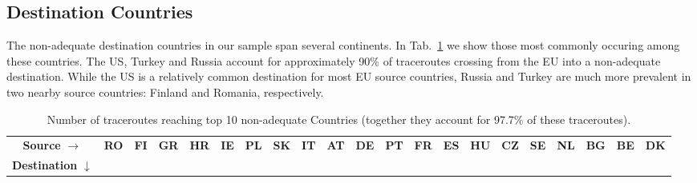 \subsection{Destination Countries}
The non-adequate destination countries in our sample
span several continents. 
In Tab.~\ref{tab:traceroutesheat} we show
those most commonly occuring among these countries.
The US, Turkey and Russia account for approximately 90\% of
traceroutes crossing from the EU into a non-adequate destination.
While the US is a relatively common destination for most EU
source countries, Russia and Turkey are much more prevalent in 
two nearby source countries: Finland and Romania, respectively.


\begin{table}
  \caption{Number of traceroutes reaching top 10 non-adequate Countries (together they account for 97.7\% of these traceroutes).}
  \label{tab:traceroutesheat}

\begin{tabular}{ccccccccccccccccccccc}
    \toprule
     \textbf{Source} $\xrightarrow{}$ & \textbf{RO} & \textbf{FI} & \textbf{GR} & \textbf{HR} & \textbf{IE} & \textbf{PL} & \textbf{SK} & \textbf{IT} & \textbf{AT} & \textbf{DE} & \textbf{PT} & \textbf{FR} & \textbf{ES} & \textbf{HU} & \textbf{CZ} & \textbf{SE} & \textbf{NL} & \textbf{BG} & \textbf{BE} & \textbf{DK} \\
    
    \textbf{Destination} $\downarrow$ & & & & & & & & & & & & & & & & & & & \\
   

\end{tabular}
\end{table}
